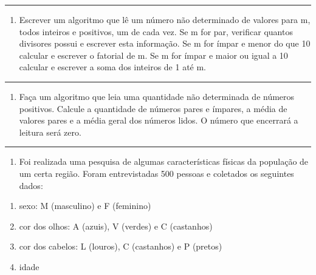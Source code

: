 \documentclass[12pt,a4paper]{article}
\renewcommand{\linethickness}{0.05em}
\providecommand{\tightlist}{%
      \setlength{\itemsep}{0pt}\setlength{\parskip}{0pt}}
\begin{document}
    \begin{center}\rule{0.5\linewidth}{\linethickness}\end{center}

\begin{enumerate}
\def\labelenumi{\arabic{enumi}.}
\setcounter{enumi}{8}
\tightlist
\item
  Escrever um algoritmo que lê um número não determinado de valores para
  m, todos inteiros e positivos, um de cada vez. Se m for par, verificar
  quantos divisores possui e escrever esta informação. Se m for ímpar e
  menor do que 10 calcular e escrever o fatorial de m. Se m for ímpar e
  maior ou igual a 10 calcular e escrever a soma dos inteiros de 1 até
  m.
\end{enumerate}

    \begin{center}\rule{0.5\linewidth}{\linethickness}\end{center}

\begin{enumerate}
\def\labelenumi{\arabic{enumi}.}
\setcounter{enumi}{9}
\tightlist
\item
  Faça um algoritmo que leia uma quantidade não determinada de números
  positivos. Calcule a quantidade de números pares e ímpares, a média de
  valores pares e a média geral dos números lidos. O número que
  encerrará a leitura será zero.
\end{enumerate}

    \begin{center}\rule{0.5\linewidth}{\linethickness}\end{center}

\begin{enumerate}
\def\labelenumi{\arabic{enumi}.}
\setcounter{enumi}{10}
\tightlist
\item
  Foi realizada uma pesquisa de algumas características físicas da
  população de um certa região. Foram entrevistadas 500 pessoas e
  coletados os seguintes dados:
\end{enumerate}

\begin{enumerate}
\def\labelenumi{\alph{enumi})}
\item
  sexo: M (masculino) e F (feminino)
\item
  cor dos olhos: A (azuis), V (verdes) e C (castanhos)
\item
  cor dos cabelos: L (louros), C (castanhos) e P (pretos)
\item
  idade
\end{enumerate}
\end{document}
